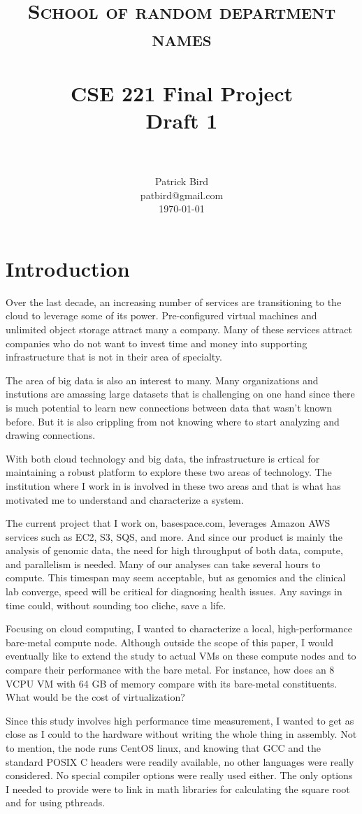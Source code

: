 \documentclass[paper=a4, fontsize=11pt]{scrartcl}
\title{
        \usefont{OT1}{bch}{b}{n}
        \normalfont \normalsize \textsc{School of random department names} \\ [25pt]
        \horrule{0.5pt} \\[0.4cm]
        \huge CSE 221 Final Project \\
        \huge       Draft 1         \\
        \horrule{2pt} \\[0.5cm]
}
\author{
        \normalfont                                 \normalsize
        Patrick Bird\\[-3pt]        \normalsize
        patbird@gmail.com\\           \normalsize
        \today
}
\date{}
\numberwithin{equation}{section}        %
\numberwithin{figure}{section}          %
\numberwithin{table}{section}               %
\begin{document}
\maketitle
\section{Introduction}
Over the last decade, an increasing number of services are transitioning to the cloud to leverage some of its power.  Pre-configured virtual machines and unlimited object storage attract many a company.  Many of these services attract companies who do not want to invest time and money into supporting infrastructure that is not in their area of specialty.

The area of big data is also an interest to many.  Many organizations and instutions are amassing large datasets that is challenging on one hand since there is much potential to learn new connections between data that wasn't known before.  But it is also crippling from not knowing where to start analyzing and drawing connections.

With both cloud technology and big data, the infrastructure is crtical for maintaining a robust platform to explore these two areas of technology.  The institution where I work in is involved in these two areas and that is what has motivated me to understand and characterize a system.

The current project that I work on, basespace.com, leverages Amazon AWS services such as EC2, S3, SQS, and more.  And since our product is mainly the analysis of genomic data, the need for high throughput of both data, compute, and parallelism is needed.  Many of our analyses can take several hours to compute.  This timespan may seem acceptable, but as genomics and the clinical lab converge, speed will be critical for diagnosing health issues.  Any savings in time could, without sounding too cliche, save a life.

Focusing on cloud computing, I wanted to characterize a local, high-performance bare-metal compute node.  Although outside the scope of this paper, I would eventually like to extend the study to actual VMs on these compute nodes and to compare their performance with the bare metal.  For instance, how does an 8 VCPU VM with 64 GB of memory compare with its bare-metal constituents.  What would be the cost of virtualization?

Since this study involves high performance time measurement, I wanted to get as close as I could to the hardware without writing the whole thing in assembly.  Not to mention, the node runs CentOS linux, and knowing that GCC and the standard POSIX C headers were readily available, no other languages were really considered.  No special compiler options were really used either.  The only options I needed to provide were to link in math libraries for calculating the square root and for using pthreads.
\end{document}
